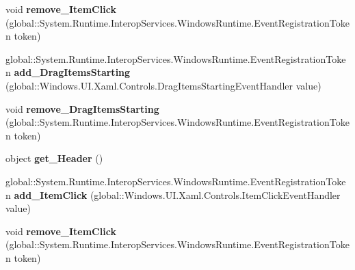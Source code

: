 \begin{DoxyCompactItemize}
void {\bfseries remove\+\_\+\+Item\+Click} (global\+::\+System.\+Runtime.\+Interop\+Services.\+Windows\+Runtime.\+Event\+Registration\+Token token)
\item 
\mbox{\label{interface_windows_1_1_u_i_1_1_xaml_1_1_controls_1_1_i_list_view_base_a3b355ad168b36f910e24d2c7ed82df17}} 
global\+::\+System.\+Runtime.\+Interop\+Services.\+Windows\+Runtime.\+Event\+Registration\+Token {\bfseries add\+\_\+\+Drag\+Items\+Starting} (global\+::\+Windows.\+U\+I.\+Xaml.\+Controls.\+Drag\+Items\+Starting\+Event\+Handler value)
\item 
\mbox{\label{interface_windows_1_1_u_i_1_1_xaml_1_1_controls_1_1_i_list_view_base_a98ffdf8ce44a2620717a8e03273d9029}} 
void {\bfseries remove\+\_\+\+Drag\+Items\+Starting} (global\+::\+System.\+Runtime.\+Interop\+Services.\+Windows\+Runtime.\+Event\+Registration\+Token token)
\item 
\mbox{\label{interface_windows_1_1_u_i_1_1_xaml_1_1_controls_1_1_i_list_view_base_a7a7ead1b392f70c5f393d65cf2a4de87}} 
object {\bfseries get\+\_\+\+Header} ()
\item 
\mbox{\label{interface_windows_1_1_u_i_1_1_xaml_1_1_controls_1_1_i_list_view_base_a381c8434df16fa7e46ceaa5d481c0653}} 
global\+::\+System.\+Runtime.\+Interop\+Services.\+Windows\+Runtime.\+Event\+Registration\+Token {\bfseries add\+\_\+\+Item\+Click} (global\+::\+Windows.\+U\+I.\+Xaml.\+Controls.\+Item\+Click\+Event\+Handler value)
\item 
\mbox{\label{interface_windows_1_1_u_i_1_1_xaml_1_1_controls_1_1_i_list_view_base_a29b603576f74e0aaac225711b42e45e6}} 
void {\bfseries remove\+\_\+\+Item\+Click} (global\+::\+System.\+Runtime.\+Interop\+Services.\+Windows\+Runtime.\+Event\+Registration\+Token token)
\item 
\mbox{\label{interface_windows_1_1_u_i_1_1_xaml_1_1_controls_1_1_i_list_view_base_a3b355ad168b36f910e24d2c7ed82df17}} 

\end{DoxyCompactItemize}
